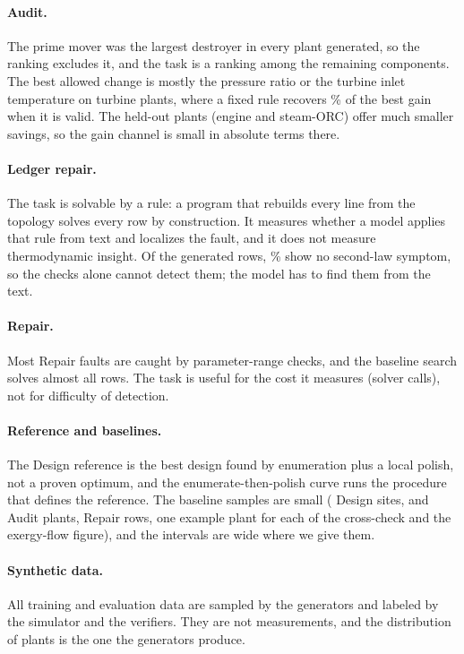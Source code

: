\paragraph{Audit.}
The prime mover was the largest destroyer in every plant generated, so the ranking excludes it, and the task is a ranking among the remaining components. The best allowed change is mostly the pressure ratio or the turbine inlet temperature on turbine plants, where a fixed rule recovers \% of the best gain when it is valid. The held-out plants (engine and steam-ORC) offer much smaller savings, so the gain channel is small in absolute terms there.

\paragraph{Ledger repair.}
The task is solvable by a rule: a program that rebuilds every line from the topology solves every row by construction. It measures whether a model applies that rule from text and localizes the fault, and it does not measure thermodynamic insight. Of the generated rows, \% show no second-law symptom, so the checks alone cannot detect them; the model has to find them from the text.

\paragraph{Repair.}
Most Repair faults are caught by parameter-range checks, and the baseline search solves almost all rows. The task is useful for the cost it measures (solver calls), not for difficulty of detection.

\paragraph{Reference and baselines.}
The Design reference is the best design found by enumeration plus a local polish, not a proven optimum, and the enumerate-then-polish curve runs the procedure that defines the reference. The baseline samples are small ( Design sites,  and  Audit plants,  Repair rows, one example plant for each of the cross-check and the exergy-flow figure), and the intervals are wide where we give them.

\paragraph{Synthetic data.}
All training and evaluation data are sampled by the generators and labeled by the simulator and the verifiers. They are not measurements, and the distribution of plants is the one the generators produce.

